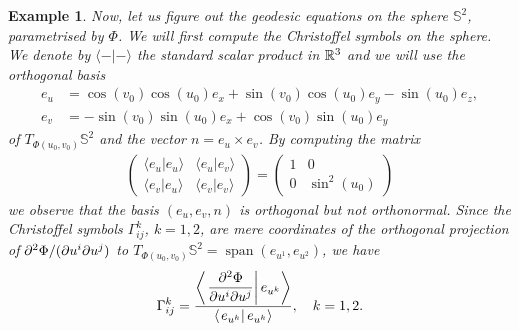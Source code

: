 \documentclass[11pt,a4paper,twoside,openany]{report}
\theoremstyle{my-theorem}
\theoremstyle{non-theorem}
\newtheorem{example}[theorem]{Example}
\begin{document}
			\begin{example}
				Now, let us figure out the geodesic equations on the sphere $\mathbb S^2$, parametrised by $\Phi$. We will first compute the Christoffel symbols on the sphere. We denote by $\langle-|-\rangle$ the standard scalar product in ${\mathbb R}^3$ and we will use the orthogonal basis
				\begin{align*}
					e_u &= \cos(v_0)\cos(u_0)e_x+\sin(v_0)\cos(u_0)e_y-\sin(u_0)e_z,
				\\
					e_v &= -\sin(v_0)\sin(u_0)e_x+\cos(v_0)\sin(u_0)e_y
				\end{align*}
				of $T_{\Phi(u_0,v_0)}\mathbb S^2$ and the vector $n = e_u \times e_v$. By computing the matrix
				\begin{align*}
					\begin{pmatrix}
						\langle e_u|e_u \rangle & \langle e_u|e_v \rangle \\
						\langle e_v|e_u \rangle & \langle e_v|e_v \rangle
					\end{pmatrix} = \begin{pmatrix}
					1 & 0 \\
					0 & \sin^2(u_0)
				\end{pmatrix}
				\end{align*}
				we observe that the basis $(e_u,e_v,n)$ is orthogonal but not orthonormal. Since the Christoffel symbols $\Gamma^k_{ij}$, $k=1,2$, are mere coordinates of the orthogonal projection of $\partial^2\Phi/(\partial u^i \partial u^j)$ to $T_{\Phi(u_0,v_0)} \mathbb S^2 = \operatorname{span}(e_{u^1},e_{u^2})$, we have
				\begin{align*}
					\Gamma^k_{ij} = \frac{\left\langle\left. \dfrac{\partial^2\Phi}{\partial u^i \partial u^j} \right| e_{u^k} \right\rangle}{\left\langle\left. e_{u^k} \right| e_{u^k} \right\rangle }, \quad k=1,2.
				\end{align*}
				

\end{example}
\end{document}
